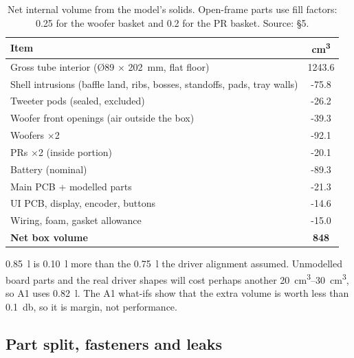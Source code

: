 \begin{table}[htbp]
\centering\small
\caption{Net internal volume from the model's solids. Open-frame parts use fill factors: \num{0.25} for the woofer basket and \num{0.2} for the PR basket. Source: \protect{} §5.}
\label{tab:volume}
\begin{tabular}{@{}l S[table-format=4.1]@{}}
\toprule
Item & {cm\textsuperscript{3}} \\
\midrule
Gross tube interior (Ø89 $\times$ \qty{202}{\milli\metre}, flat floor) & 1243.6 \\
Shell intrusions (baffle land, ribs, bosses, standoffs, pads, tray walls) & -75.8 \\
Tweeter pods (sealed, excluded) & -26.2 \\
Woofer front openings (air outside the box) & -39.3 \\
Woofers $\times$2 & -92.1 \\
PRs $\times$2 (inside portion) & -20.1 \\
Battery (nominal) & -89.3 \\
Main PCB + modelled parts & -21.3 \\
UI PCB, display, encoder, buttons & -14.6 \\
Wiring, foam, gasket allowance & -15.0 \\
\midrule
\textbf{Net box volume} & \bfseries 848 \\
\bottomrule
\end{tabular}
\end{table}

\qty{0.85}{\litre} is \qty{0.10}{\litre} more than the \qty{0.75}{\litre} the driver alignment assumed. Unmodelled board parts and the real driver shapes will cost perhaps another \qtyrange{20}{30}{\centi\metre\cubed}, so A1 uses \qty{0.82}{\litre}. The A1 what-ifs show that the extra volume is worth less than \qty{0.1}{\decibel}, so it is margin, not performance.

\subsection{Part split, fasteners and leaks}

